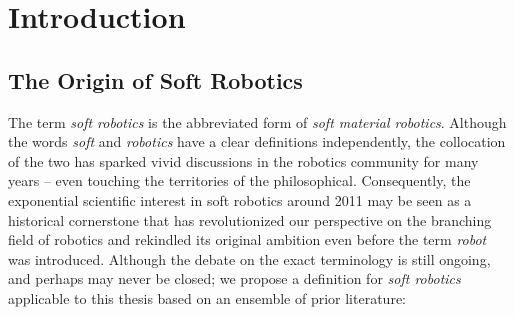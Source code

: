 \newpage
\chapter{Introduction}
\thispagestyle{empty}
\label{chap: intro}
\setcounter{page}{1}


\vspace*{-2mm}
\section{The Origin of Soft Robotics}
\label{sec: chap1 motivation}
The term \emph{soft robotics} is the abbreviated form of \emph{soft material robotics}. Although the words \emph{soft} and \emph{robotics} have a clear definitions independently, the collocation of the two has sparked vivid discussions in the robotics community for many years -- even touching the territories of the philosophical. Consequently, the exponential scientific interest in soft robotics around 2011 may be seen as a historical cornerstone that has revolutionized our perspective on the branching field of robotics and rekindled its original ambition even before the term \emph{robot} was introduced. Although the debate on the exact terminology is still ongoing, and perhaps may never be closed; we propose a definition for \emph{soft robotics} applicable to this thesis based on an ensemble of prior literature:


